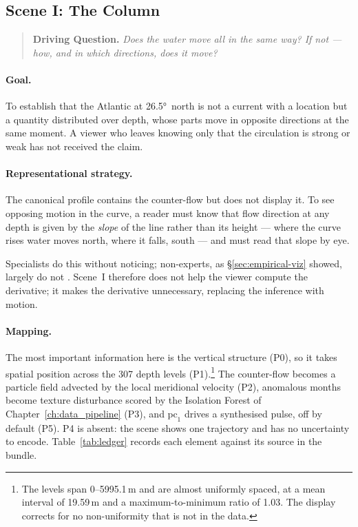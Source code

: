 \subsection{Scene I: The Column}
\label{subsec:scene-column}

\begin{quote}
\textbf{Driving Question.} \emph{Does the water move all in the same way? If not --- how, and in which directions, does it move?}
\end{quote}



\paragraph{Goal.} To establish that the Atlantic at \ang{26.5}~north is not a current with a location but a quantity distributed over depth, whose parts move in opposite directions at the same moment. A viewer who leaves knowing only that the circulation is strong or weak has not received the claim.

\paragraph{Representational strategy.} The canonical profile contains the counter-flow but does not display it. To see opposing motion in the curve, a reader must know that flow direction at any depth is given by the \emph{slope} of the line rather than its height --- where the curve rises water moves north, where it falls, south --- and must read that slope by eye.

Specialists do this without noticing; non-experts, as \S\ref{sec:empirical-viz} showed, largely do not \parencite{harold2016, mcmahon2015, fischer2020}. Scene~I therefore does not help the viewer compute the derivative; it makes the derivative unnecessary, replacing the inference with motion.

\paragraph{Mapping.} The most important information here is the vertical structure (P0), so it takes spatial position across the 307 depth levels (P1).\footnote{The levels span 0--5995.1\,m and are almost uniformly spaced, at a mean interval of 19.59\,m and a maximum-to-minimum ratio of 1.03. The display corrects for no non-uniformity that is not in the data.} The counter-flow becomes a particle field advected by the local meridional velocity (P2), anomalous months become texture disturbance scored by the Isolation Forest of Chapter~\ref{ch:data_pipeline} (P3), and $\mathrm{pc}_1$ drives a synthesised pulse, off by default (P5). P4 is absent: the scene shows one trajectory and has no uncertainty to encode. Table~\ref{tab:ledger} records each element against its source in the bundle.


